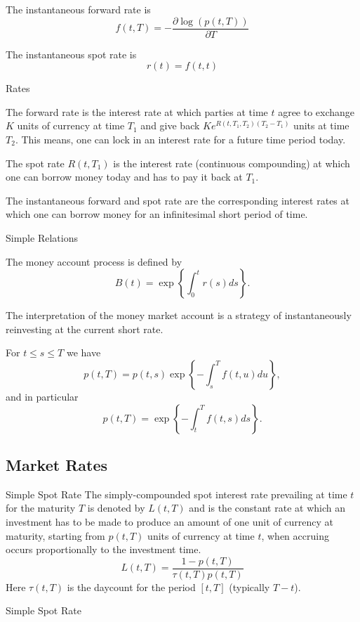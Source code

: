 	The instantaneous forward rate is
\[
f(t,T)=-\frac{\partial \log(p(t,T))}{\partial T}
\]

	 The instantaneous spot rate is
\[
r(t)=f(t,t)
\]


{Rates}


	The forward rate is the interest rate at which parties
at time $t$ agree to exchange $K$ units of currency at time $T_1$
and give back $Ke^{R(t,T_1,T_2)(T_2-T_1)}$ units at time $T_2$.
This means, one can lock in an interest rate for a future time
period today.

	The spot rate $R(t,T_1)$ is the interest
rate (continuous compounding) at which one can borrow money today
and has to pay it back at $T_1$.

	The instantaneous
forward and spot rate are the corresponding interest rates at
which one can borrow money for an infinitesimal short period of
time.


{Simple Relations}

The money account process is defined by
$$
B(t) = \exp\left\{ \int_0^t r(s) ds\right\}\!.
$$

The interpretation of the money market account is a strategy of
instantaneously reinvesting at the current short rate.

For $t \leq s \leq T$ we have
$$
p(t,T) = p(t,s) \exp\left\{-\int_s^T f(t,u) du\right\}\!,
$$
and in particular
$$
p(t,T) = \exp\left\{-\int_t^T f(t,s) ds\right\}\!.
$$

\subsection{Market Rates}

{Simple Spot Rate}
The simply-compounded spot interest rate prevailing at time $t$ for
the maturity $T$ is denoted by $L(t,T)$ and is the constant rate
at which an investment has to be made to produce an amount of one
unit of currency at maturity, starting from $p(t,T)$ units of
currency at time $t$, when accruing occurs proportionally to the
investment time.
\begin{equation}\label{LIBOR-spot}
L(t,T)=\frac{1-p(t,T)}{\tau(t,T)p(t,T)}
\end{equation}
Here $\tau(t,T)$ is the
daycount for the period $[t,T]$ (typically $T-t$).

{Simple Spot Rate}

